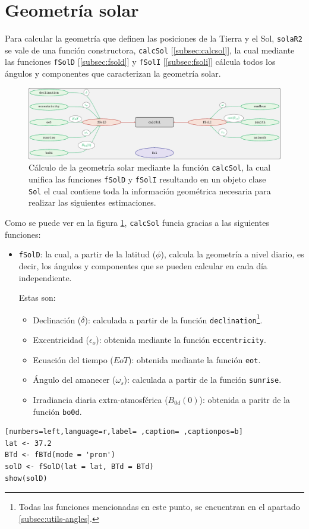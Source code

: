 \section{Geometría solar}
\label{sec:orga81b0df}
\label{sec:geometria-solar}
Para calcular la geometría que definen las posiciones de la Tierra y el Sol, \texttt{solaR2} se vale de una función constructora, \texttt{calcSol} [\ref{subsec:calcsol}], la cual mediante las funciones \texttt{fSolD} [\ref{subsec:fsold}] y \texttt{fSolI} [\ref{subsec:fsoli}] cálcula todos los ángulos y componentes que caracterizan la geometría solar.
\begin{figure}[]
\centering
\includegraphics[keepaspectratio,width=\textwidth,height=0.5\textheight]{figuras/calcSol.pdf}
\caption{Cálculo de la geometría solar mediante la función \texttt{calcSol}, la cual unifica las funciones \texttt{fSolD} y \texttt{fSolI} resultando en un objeto clase \texttt{Sol} el cual contiene toda la información geométrica necesaria para realizar las siguientes estimaciones. \label{fig:calcSol}}
\end{figure}

Como se puede ver en la figura \ref{fig:calcSol}, \texttt{calcSol} funcia gracias a las siguientes funciones:
\begin{itemize}
\item \texttt{fSolD}: la cual, a partir de la latitud (\(\phi\)), calcula la geometría a nivel diario, es decir, los ángulos y componentes que se pueden calcular en cada día independiente.

Estas son:
\begin{itemize}
\item Declinación (\(\delta\)): calculada a partir de la función \texttt{declination}\footnote{Todas las funciones mencionadas en este punto, se encuentran en el apartado \ref{subsec:utils-angles}.}.
\item Excentricidad (\(\epsilon_o\)): obtenida mediante la función \texttt{eccentricity}.
\item Ecuación del tiempo (\(EoT\)): obtenida mediante la función \texttt{eot}.
\item Ángulo del amanecer (\(\omega_s\)): calculada a partir de la función \texttt{sunrise}.
\item Irradiancia diaria extra-atmosférica (\(B_{0d}(0)\)): obtenida a paritr de la función \texttt{bo0d}.
\end{itemize}
\end{itemize}
\begin{lstlisting}[numbers=left,language=r,label= ,caption= ,captionpos=b]
lat <- 37.2
BTd <- fBTd(mode = 'prom')
solD <- fSolD(lat = lat, BTd = BTd)
show(solD)
\end{lstlisting}

